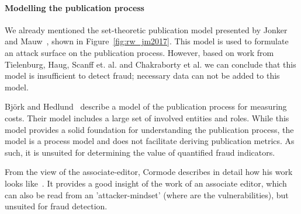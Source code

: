 \documentclass{ou-report}
\newcommand{\outline}[1]{{\color{blue} #1}}
\begin{document}
\paragraph{Modelling the publication process} \label{rw_publication_process}
We already mentioned the set-theoretic publication model presented by 
Jonker and Mauw~\cite{JM2017}, shown in Figure~\ref{fig:rw_jm2017}. This model
is used to formulate an attack surface on the publication process. However, 
based on work from Tielenburg, Haug, Scanff et. al. and Chakraborty et al. we 
can conclude that this model is insufficient to detect fraud; necessary data can 
not be added to this model.

Björk and Hedlund~\cite{BH2004} describe a  model of the publication process
for measuring costs. Their model includes a large set of involved entities
and roles. While this model provides a solid foundation for understanding the
publication process, the model is a process model and does not facilitate
deriving publication metrics. As such, it is unsuited for determining
the value of quantified fraud indicators.

From the view of the associate-editor, Cormode describes in detail how his work
looks like~\cite{C2013}. It provides a good insight of the work of an associate 
editor, which can also be read from an 'attacker-mindset' (where are the 
vulnerabilities), but unsuited for fraud detection.
\end{document}
